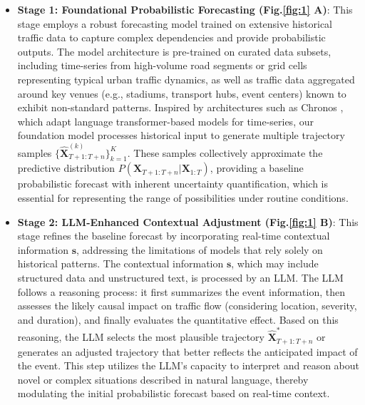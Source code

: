 \documentclass{article}
\begin{document}
\begin{itemize}
    \item \textbf{Stage 1: Foundational Probabilistic Forecasting (Fig.\ref{fig:1} A)}: This stage employs a robust forecasting model trained on extensive historical traffic data to capture complex dependencies and provide probabilistic outputs. The model architecture is pre-trained on curated data subsets, including time-series from high-volume road segments or grid cells representing typical urban traffic dynamics, as well as traffic data aggregated around key venues (e.g., stadiums, transport hubs, event centers) known to exhibit non-standard patterns. Inspired by architectures such as Chronos \cite{ansari_chronos_2024}, which adapt language transformer-based models for time-series, our foundation model processes historical input to generate multiple trajectory samples $\{\hat{\mathbf{X}}^{(k)}_{T+1:T+n}\}_{k=1}^K$. These samples collectively approximate the predictive distribution $P(\mathbf{X}_{T+1:T+n} | \mathbf{X}_{1:T})$, providing a baseline probabilistic forecast with inherent uncertainty quantification, which is essential for representing the range of possibilities under routine conditions.
    
    \item \textbf{Stage 2: LLM-Enhanced Contextual Adjustment (Fig.\ref{fig:1} B)}: This stage refines the baseline forecast by incorporating real-time contextual information $\mathbf{s}$, addressing the limitations of models that rely solely on historical patterns. The contextual information $\mathbf{s}$, which may include structured data and unstructured text, is processed by an LLM. The LLM follows a reasoning process: it first summarizes the event information, then assesses the likely causal impact on traffic flow (considering location, severity, and duration), and finally evaluates the quantitative effect. Based on this reasoning, the LLM selects the most plausible trajectory $\hat{\mathbf{X}}^*_{T+1:T+n}$ or generates an adjusted trajectory that better reflects the anticipated impact of the event. This step utilizes the LLM's capacity to interpret and reason about novel or complex situations described in natural language, thereby modulating the initial probabilistic forecast based on real-time context.
    

\end{itemize}
\end{document}
